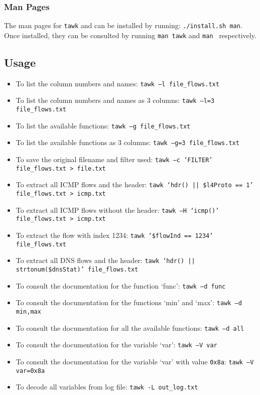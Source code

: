 \documentclass[documentation]{subfiles}
\begin{document}
\subsubsection{Man Pages}
The man pages for {\tt tawk} and {\tt{}} can be installed by running: {\tt ./install.sh man}.
Once installed, they can be consulted by running {\tt man tawk} and {\tt man } respectively.

\subsection{Usage}
\begin{itemize}
    \item To list the column numbers and names: {\tt tawk --l file\_flows.txt}
    \item To list the column numbers and names as 3 columns: {\tt tawk --l=3 file\_flows.txt}
    \item To list the available functions: {\tt tawk --g file\_flows.txt}
    \item To list the available functions as 3 columns: {\tt tawk --g=3 file\_flows.txt}
    \item To save the original filename and filter used: {\tt tawk --c `FILTER' file\_flows.txt > file.txt}
    \item To extract all ICMP flows and the header: {\tt tawk `hdr() || \$l4Proto == 1' file\_flows.txt > icmp.txt}
    \item To extract all ICMP flows without the header: {\tt tawk --H `icmp()' file\_flows.txt > icmp.txt}
    \item To extract the flow with index 1234: {\tt tawk `\$flowInd == 1234' file\_flows.txt}
    \item To extract all DNS flows and the header: {\tt tawk `hdr() || strtonum(\$dnsStat)' file\_flows.txt}
    \item To consult the documentation for the function `func': {\tt tawk --d func}
    \item To consult the documentation for the functions `min' and `max': {\tt tawk --d min,max}
    \item To consult the documentation for all the available functions: {\tt tawk --d all}
    \item To consult the documentation for the variable `var': {\tt tawk --V var}
    \item To consult the documentation for the variable `var' with value {\tt 0x8a}: {\tt tawk --V var=0x8a}
    \item To decode all variables from  log file: {\tt tawk -L out\_log.txt}

\end{itemize}
\end{document}
